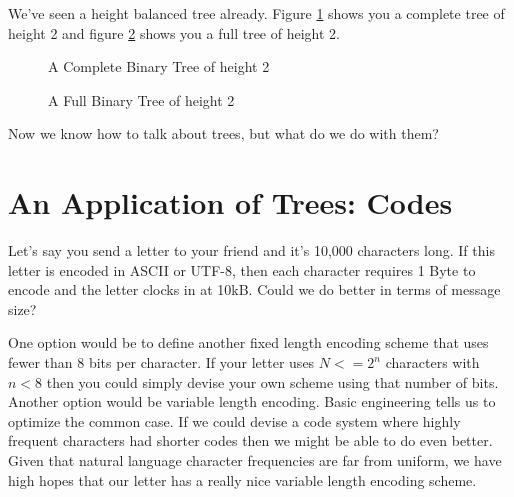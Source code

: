 \documentclass[]{tufte-handout}
\begin{document}
We've seen a height balanced tree already. Figure \ref{fig:complete} shows you a complete tree of height 2 and figure \ref{fig:full} shows you a full tree of height 2. 

\begin{figure}[!htbp]
\caption{A Complete Binary Tree of height 2}
\label{fig:complete}
\end{figure}


\begin{figure}[!htbp]
\caption{A Full Binary Tree of height 2}
\label{fig:full}
\end{figure}

Now we know how to talk about trees, but what do we do with them? 

\section{An Application of Trees: Codes}

Let's say you send a letter to your friend and it's 10,000 characters long. If this letter is encoded in ASCII or UTF-8, then each character requires 1 Byte to encode and the letter clocks in at 10kB. Could we do better in terms of message size?  

One option would be to define another fixed length encoding scheme that uses fewer than 8 bits per character. If your letter uses $N <= 2^n$ characters with $n < 8$ then you could simply devise your own scheme using that number of bits. Another option would be variable length encoding.  Basic engineering tells us to optimize the common case. If we could devise a code system where highly frequent characters had shorter codes then we might be able to do even better. Given that natural language character frequencies are far from uniform, we have high hopes that our letter has a really nice variable length encoding scheme. 
\end{document}
